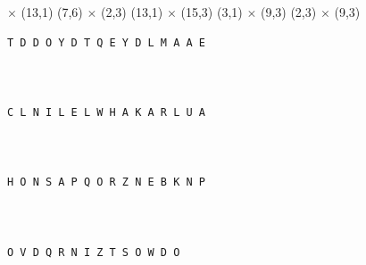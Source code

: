 \documentclass{puzzlehunt}
\begin{document}
   \(\times\) (13,1)
  \hspace*{\fill}
  (7,6) \(\times\) (2,3)
  \hspace*{\fill}
  (13,1) \(\times\) (15,3)
  \hspace*{\fill}
  (3,1) \(\times\) (9,3)
  \hspace*{\fill}
  (2,3) \(\times\) (9,3)

\vfill\vfill







  \vfill


  {\Huge
  \begin{verbatim}
T D D O Y D T Q E Y D L M A A E



C L N I L E L W H A K A R L U A



H O N S A P Q O R Z N E B K N P



O V D Q R N I Z T S O W D O
  \end{verbatim}
  }


  \vfill\vfill









\end{document}
